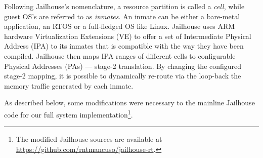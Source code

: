 Following Jailhouse's nomenclature, a resource partition is called a
\emph{cell}, while guest OS's are referred to as \emph{inmates}. An
inmate can be either a bare-metal application, an RTOS or a
full-fledged OS like Linux. Jailhouse uses ARM hardware Virtualization
Extensions (VE) to offer a set of Intermediate Physical Address (IPA)
to its inmates that is compatible with the way they have been
compiled. Jailhouse then maps IPA ranges of different cells to
configurable Physical Addresses (PAs) --- stage-2 translation. By
changing the configured stage-2 mapping, it is possible to dynamically
re-route via the loop-back the memory traffic generated by each
inmate.

As described below, some modifications were necessary to the mainline
Jailhouse code for our full system implementation\footnote{The
  modified Jailhouse sources are available at \url{https://github.com/rntmancuso/jailhouse-rt}.}.



